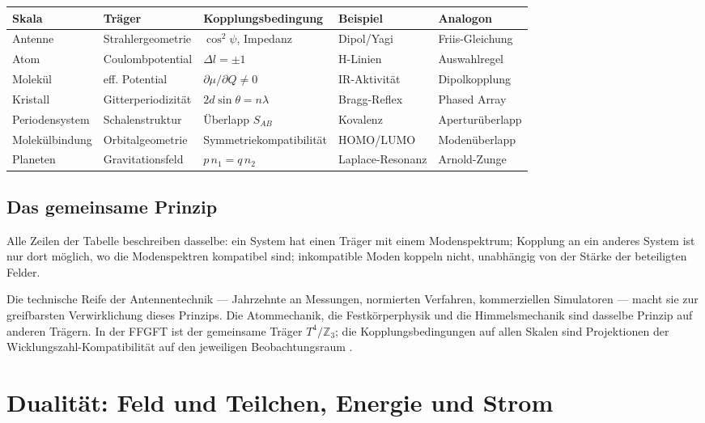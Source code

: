 \begin{center}
\begin{tabular}{@{}lllll@{}}
\toprule
\textbf{Skala} & \textbf{Träger} & \textbf{Kopplungsbedingung}
  & \textbf{Beispiel} & \textbf{Analogon} \\
\midrule
Antenne & Strahlergeometrie & $\cos^2\psi$, Impedanz
  & Dipol/Yagi & Friis-Gleichung \\
Atom & Coulombpotential & $\Delta l=\pm1$
  & H-Linien & Auswahlregel \\
Molekül & eff. Potential & $\partial\mu/\partial Q \neq 0$
  & IR-Aktivität & Dipolkopplung \\
Kristall & Gitterperiodizität & $2d\sin\theta=n\lambda$
  & Bragg-Reflex & Phased Array \\
Periodensystem & Schalenstruktur & Überlapp $S_{AB}$
  & Kovalenz & Aperturüberlapp \\
Molekülbindung & Orbitalgeometrie & Symmetriekompatibilität
  & HOMO/LUMO & Modenüberlapp \\
Planeten & Gravitationsfeld & $p\,n_1 = q\,n_2$
  & Laplace-Resonanz & Arnold-Zunge \\
\bottomrule
\end{tabular}
\end{center}

\subsection*{Das gemeinsame Prinzip}

Alle Zeilen der Tabelle beschreiben dasselbe: ein System hat einen
Träger mit einem Modenspektrum; Kopplung an ein anderes System ist
nur dort möglich, wo die Modenspektren kompatibel sind; inkompatible
Moden koppeln nicht, unabhängig von der Stärke der beteiligten Felder.

Die technische Reife der Antennentechnik --- Jahrzehnte an Messungen,
normierten Verfahren, kommerziellen Simulatoren --- macht sie zur
greifbarsten Verwirklichung dieses Prinzips. Die Atommechanik,
die Festkörperphysik und die Himmelsmechanik sind dasselbe Prinzip
auf anderen Trägern. In der FFGFT ist der gemeinsame Träger
$T^4/\mathbb{Z}_3$; die Kopplungsbedingungen auf allen Skalen sind
Projektionen der Wicklungszahl-Kompatibilität auf den jeweiligen
Beobachtungsraum \SM.

\section{Dualität: Feld und Teilchen, Energie und Strom}

